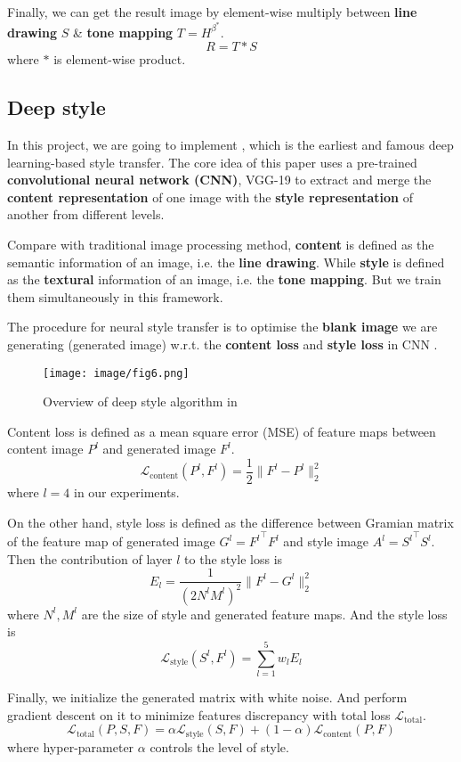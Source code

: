 Finally, we can get the result image by element-wise multiply between \textbf{line drawing} \(S\) \& \textbf{tone mapping} \(T=H^{\beta^{\ast}}\).
\[
    R = T \ast S
\]
where \(\ast\) is element-wise product.

\subsection{Deep style}
In this project, we are going to implement \cite{CVPR2016_Gatys_stcnn}, which is the earliest and famous deep learning-based style transfer. The core idea of this paper uses a pre-trained \textbf{convolutional neural network (CNN)}, VGG-19 to extract and merge the \textbf{content representation} of one image with the \textbf{style representation} of another from different levels.

Compare with traditional image processing method, \textbf{content} is defined as the semantic information of an image, i.e. the \textbf{line drawing}. While \textbf{style} is defined as the \textbf{textural} information of an image, i.e. the \textbf{tone mapping}. But we train them simultaneously in this framework.

The procedure for neural style transfer is to optimise the \textbf{blank image} we are generating (generated image) w.r.t. the \textbf{content loss} and \textbf{style loss} in CNN .
\begin{figure}
    \centering
    \texttt{[image: image/fig6.png]}
    \caption{Overview of deep style algorithm in \cite{CVPR2016_Gatys_stcnn}}
    \label{fig6}
\end{figure}
Content loss is defined as a mean square error (MSE) of feature maps between content image \(P^{l}\) and generated image \(F^{l}\). 
\[
\mathcal{L}_{\mbox{content}}(P^{l}, F^{l}) = \frac{1}{2} \|F^{l}- P^{l}\|^{2}_{2}
\]
where \(l=4\) in our experiments.

On the other hand, style loss is defined as the difference between Gramian matrix of the feature map of generated image \(G^{l}={F^{l}}^{\top}F^{l}\) and style image \(A^{l}={S^{l}}^{\top}S^{l}\).
Then the contribution of layer \(l\) to the style loss is
\[
E_{l} = \frac{1}{(2N^{l}M^{l})^{2}} \|F^{l}-G^{l}\|^{2}_{2}
\]
where \(N^{l}, M^{l}\) are the size of style and generated feature maps.
And the style loss is
\[
\mathcal{L}_{\mbox{style}}(S^{l}, F^{l}) = \sum_{l=1}^{5} w_{l} E_{l}
\]

Finally, we initialize the generated matrix with white noise. And perform gradient descent on it to minimize features discrepancy with total loss \(\mathcal{L}_{\mbox{total}}\).
\[
\mathcal{L}_{\mbox{total}}(P, S, F) = \alpha \mathcal{L}_{\mbox{style}}(S, F) + (1 - \alpha) \mathcal{L}_{\mbox{content}}(P, F)
\]
where hyper-parameter \(\alpha\) controls the level of style.

